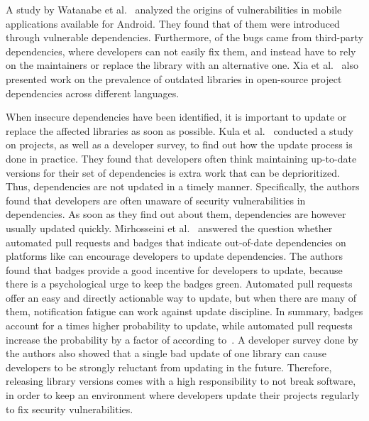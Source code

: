 A study by Watanabe et al.~\cite{watanabe2017} analyzed the origins of vulnerabilities in mobile applications available
for Android.
They found that  of them were introduced through vulnerable dependencies.
Furthermore,  of the bugs came from third-party dependencies, where developers can not easily fix them,
and instead have to rely on the maintainers or replace the library with an alternative one.
Xia et al.~\cite{xia2014} also presented work on the prevalence of outdated libraries in open-source project
dependencies across different languages.

When insecure dependencies have been identified, it is important to update or replace the affected libraries as soon as
possible.
Kula et al.~\cite{kula2017} conducted a study on \github{} projects, as well as a developer survey, to find out how the
update process is done in practice.
They found that developers often think maintaining up-to-date versions for their set of dependencies is extra work that
can be deprioritized.
Thus, dependencies are not updated in a timely manner.
Specifically, the authors found that developers are often unaware of security vulnerabilities in dependencies.
As soon as they find out about them, dependencies are however usually updated quickly.
Mirhosseini et al.~\cite{mirhosseini2017} answered the question whether automated pull requests and badges that indicate
out-of-date dependencies on platforms like \github{} can encourage developers to update dependencies.
The authors found that badges provide a good incentive for developers to update, because there is a psychological urge
to keep the badges green.
Automated pull requests offer an easy and directly actionable way to update, but when there are many of them,
notification fatigue can work against update discipline.
In summary, badges account for a  times higher probability to update, while automated pull requests
increase the probability by a factor of  according to~\cite{mirhosseini2017}.
A developer survey done by the authors also showed that a single bad update of one library can cause developers to be
strongly reluctant from updating in the future.
Therefore, releasing library versions comes with a high responsibility to not break software, in order to keep an
environment where developers update their projects regularly to fix security vulnerabilities.
